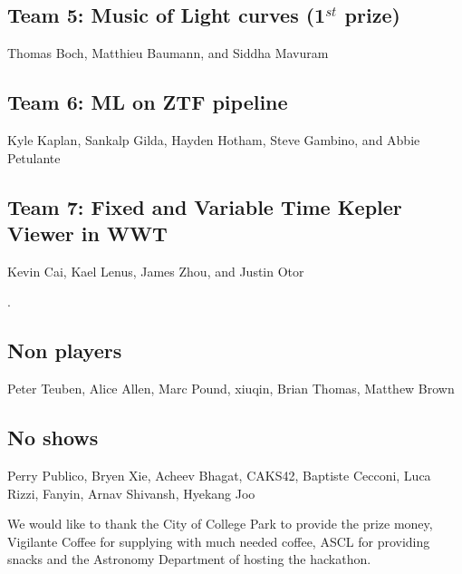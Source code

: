 \documentclass[11pt,twoside]{article}
\begin{document}
\subsection*{Team 5: Music of Light curves (1$^{st}$ prize)}

Thomas Boch, Matthieu Baumann, and Siddha Mavuram


\subsection*{Team 6: ML on ZTF pipeline}


Kyle Kaplan, Sankalp Gilda, Hayden Hotham, Steve Gambino, and Abbie Petulante


\subsection*{Team 7: Fixed and Variable Time Kepler Viewer in WWT}

Kevin Cai, Kael Lenus, James Zhou, and Justin Otor


\citep{foo}.

\subsection*{Non players}

Peter Teuben,
Alice Allen,
Marc Pound,
xiuqin,
Brian Thomas,
Matthew Brown

\subsection*{No shows}

Perry Publico,
Bryen Xie,
Acheev Bhagat,
CAKS42,
Baptiste Cecconi,
Luca Rizzi,
Fanyin,
Arnav Shivansh,
Hyekang Joo

\acknowledgements We would like to thank the City of College Park to
provide the prize money, Vigilante Coffee for supplying with much
needed coffee, ASCL for providing snacks and the Astronomy Department
of hosting the hackathon.




\end{document}
